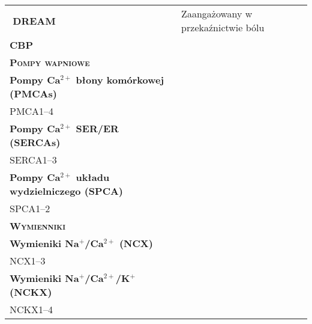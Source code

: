 \begin{scriptsize}
\begin{center}
\begin{longtable}{p{8cm}p{8cm}}
$$\hspace{0.25cm} \textbf{DREAM}& Zaangażowany w przekaźnictwie bólu\\
\hspace{0.25cm} \textbf{CBP}&\\
\multicolumn{2}{l}{\textsc{\textbf{Pompy wapniowe}}} \\[0.175em]
\hspace{0.25cm} \textbf{Pompy Ca$^{2+}$ błony komórkowej (PMCAs)}&\\
\hspace{1cm} PMCA1--4&\\
\hspace{0.25cm} \textbf{Pompy Ca$^{2+}$ SER/ER (SERCAs)}&\\
\hspace{1cm} SERCA1--3&\\
\hspace{0.25cm} \textbf{Pompy Ca$^{2+}$ układu wydzielniczego (SPCA)}&\\
\hspace{1cm} SPCA1--2&\\
\multicolumn{2}{l}{\textsc{\textbf{Wymienniki}}} \\[0.175em]
\hspace{0.25cm} \textbf{Wymieniki Na$^+$/Ca$^{2+}$ (NCX)}&\\
\hspace{1cm} NCX1--3&\\
\hspace{0.25cm} \textbf{Wymieniki Na$^+$/Ca$^{2+}$/K$^+$ (NCKX)}&\\
\hspace{1cm} NCKX1--4&\\
\bottomrule[0.12em]
\end{longtable}
\end{center}
\end{scriptsize}